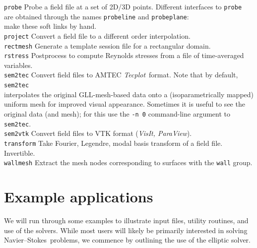 \documentclass[11pt]{report}
\newcommand{\Tecplot}{\emph{Tecplot}}
\newcommand\NavSto{Navier--Stokes}
\begin{document}
\begin{tabbing}
\texttt{probe} \>   
        Probe a field file at a set of 2D/3D points. Different
        interfaces to \texttt{probe}\\ \> are obtained through the names
        \texttt{probeline} and \texttt{probeplane}: \\ \> make these soft
        links by hand.\\
\texttt{project} \>   
        Convert a field file to a different order interpolation.\\
\texttt{rectmesh} \>
        Generate a template session file for a rectangular domain.\\
\texttt{rstress} \>
	Postprocess to compute Reynolds stresses from a file of
        time-averaged variables.\\
\texttt{sem2tec} \>   
        Convert field files to AMTEC \Tecplot\ format.
        Note that by default, \verb|sem2tec| \\
        \> interpolates the
        original GLL-mesh-based data onto 
        a (isoparametrically mapped) \\ \> uniform mesh for improved visual 
        appearance.  Sometimes it is useful  to see the \\ \> original data 
        (and mesh); for this use the \verb+-n 0+ command-line
        argument to \verb+sem2tec+.\\
\texttt{sem2vtk} \>   
        Convert field files to VTK format (\emph{VisIt, ParaView}).\\
\texttt{transform} \>      
        Take Fourier, Legendre, modal basis transform of a field
	file. Invertible.\\
\texttt{wallmesh} \>      
        Extract the mesh nodes corresponding to surfaces with the
	\verb+wall+ group.
\end{tabbing}




\chapter{Example applications}
\label{ch.examples}

We will run through some examples to illustrate input files, utility
routines, and use of the solvers.  While most users will likely be
primarily interested in solving \NavSto\ problems, we commence by
outlining the use of the elliptic solver.
\end{document}
